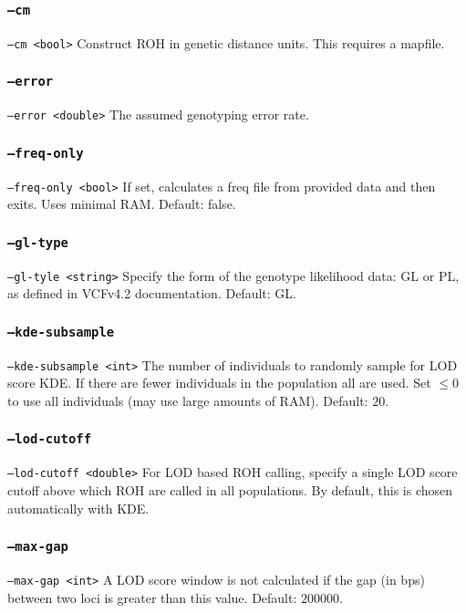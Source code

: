\documentclass[12pt]{article}%
\begin{document}
\subsubsection{{\tt --cm}}

{\tt --cm <bool>} Construct ROH in genetic distance units. This requires a mapfile.

\subsubsection{{\tt --error}}

{\tt --error <double>} The assumed genotyping error rate.

\subsubsection{{\tt --freq-only}}

{\tt --freq-only <bool>} If set, calculates a freq file from provided data and then exits. Uses minimal RAM. Default: false.

\subsubsection{{\tt --gl-type}}

{\tt --gl-tyle <string>} Specify the form of the genotype likelihood data: GL or PL, as defined in VCFv4.2 documentation. Default: GL.

\subsubsection{{\tt --kde-subsample}}

{\tt --kde-subsample <int>} The number of individuals to randomly sample for LOD score KDE. If there are fewer individuals in the population all are used. Set $\le 0$ to use all individuals (may use large amounts of RAM). Default: $20$.

\subsubsection{{\tt --lod-cutoff}}
{\tt --lod-cutoff <double>} For LOD based ROH calling, specify a single LOD score cutoff above which ROH are called in all populations.  By default, this is chosen automatically with KDE.

\subsubsection{{\tt --max-gap}}
{\tt --max-gap <int>} A LOD score window is not calculated if the gap (in bps) between two loci is greater than this value. Default: $200000$.
\end{document}
